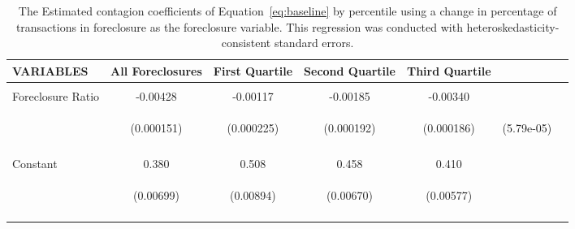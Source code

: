 \begin{table}\Tiny\label{table:robust_results}
\begin{centering}
\caption{\Tiny The Estimated contagion coefficients of Equation~\ref{eq:baseline} by percentile using a change in percentage of transactions in foreclosure as the foreclosure variable. This regression was conducted with heteroskedasticity-consistent standard errors.}

\begin{tabular}{lcccccc} \hline

VARIABLES & All Foreclosures & First Quartile & Second Quartile & Third Quartile \\ \hline
 &    &  &  &  \\
Foreclosure Ratio                 &-0.00428 & -0.00117 & -0.00185 & -0.00340\\
& \begin{footnotesize}(0.000151)\end{footnotesize} & \begin{footnotesize}(0.000225)\end{footnotesize} & \begin{footnotesize}(0.000192)\end{footnotesize} & \begin{footnotesize}(0.000186)\end{footnotesize} & 
\begin{footnotesize}(5.79e-05)\end{footnotesize} \\
\vspace{4pt}& \begin{footnotesize}\end{footnotesize} & \begin{footnotesize}\end{footnotesize} & \begin{footnotesize}\end{footnotesize} & \begin{footnotesize}\end{footnotesize} & \begin{footnotesize}\end{footnotesize}\\

Constant                          & 0.380 &0.508 &0.458 &0.410\\
& \begin{footnotesize}(0.00699)\end{footnotesize} & 
\begin{footnotesize}(0.00894)\end{footnotesize} & \begin{footnotesize}(0.00670)\end{footnotesize} & \begin{footnotesize}(0.00577)\end{footnotesize}  \\

 &  &  &  &  &  \\
 \hline
\end{tabular}
\end{centering}
\end{table}
